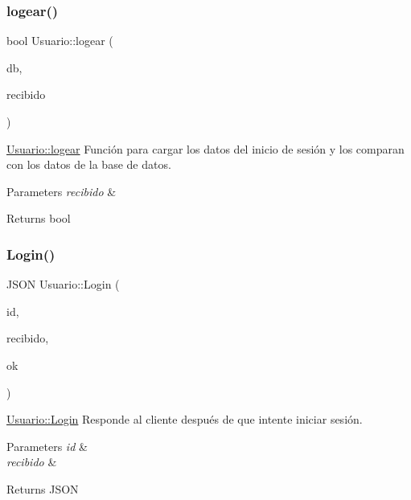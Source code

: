 \subsubsection{\texorpdfstring{logear()}{logear()}}
{\footnotesize\ttfamily bool Usuario\+::logear (\begin{DoxyParamCaption}\item[{Q\+Sql\+Database}]{db,  }\item[{J\+S\+ON}]{recibido }\end{DoxyParamCaption})}



\mbox{\hyperlink{classUsuario_a95a63c1e8c167f7084198257dbb0ad60}{Usuario\+::logear}} Función para cargar los datos del inicio de sesión y los comparan con los datos de la base de datos. 


\begin{DoxyParams}{Parameters}
{\em recibido} & \\
\hline
\end{DoxyParams}
\begin{DoxyReturn}{Returns}
bool 
\end{DoxyReturn}
\mbox{\label{classUsuario_a872132bd9723c5d50fcb13cafb9e32f3}} 
\subsubsection{\texorpdfstring{Login()}{Login()}}
{\footnotesize\ttfamily J\+S\+ON Usuario\+::\+Login (\begin{DoxyParamCaption}\item[{int}]{id,  }\item[{J\+S\+ON}]{recibido,  }\item[{bool}]{ok }\end{DoxyParamCaption})}



\mbox{\hyperlink{classUsuario_a872132bd9723c5d50fcb13cafb9e32f3}{Usuario\+::\+Login}} Responde al cliente después de que intente iniciar sesión. 


\begin{DoxyParams}{Parameters}
{\em id} & \\
\hline
{\em recibido} & \\
\hline
\end{DoxyParams}
\begin{DoxyReturn}{Returns}
J\+S\+ON 
\end{DoxyReturn}
\mbox{\label{classUsuario_a367203925ceb4d4c5bba0dd9cde3df5e}} 

